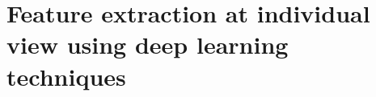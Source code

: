 
\section{Feature extraction at individual view using deep learning techniques} \label{sec:private}
    
    
